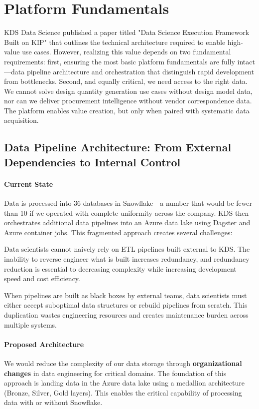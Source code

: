 \documentclass[12pt, a4paper]{article}
\begin{document}
\section{Platform Fundamentals}

KDS Data Science published a paper titled "Data Science Execution Framework Built on KIP" that outlines the technical architecture required to enable high-value use cases. However, realizing this value depends on two fundamental requirements: first, ensuring the most basic platform fundamentals are fully intact—data pipeline architecture and orchestration that distinguish rapid development from bottlenecks. Second, and equally critical, we need access to the right data. We cannot solve design quantity generation use cases without design model data, nor can we deliver procurement intelligence without vendor correspondence data. The platform enables value creation, but only when paired with systematic data acquisition.

\subsection{Data Pipeline Architecture: From External Dependencies to Internal Control}

\paragraph{Current State}
Data is processed into 36 databases in Snowflake—a number that would be fewer than 10 if we operated with complete uniformity across the company. KDS then orchestrates additional data pipelines into an Azure data lake using Dagster and Azure container jobs. This fragmented approach creates several challenges:

Data scientists cannot naively rely on ETL pipelines built external to KDS. The inability to reverse engineer what is built increases redundancy, and redundancy reduction is essential to decreasing complexity while increasing development speed and cost efficiency.

When pipelines are built as black boxes by external teams, data scientists must either accept suboptimal data structures or rebuild pipelines from scratch. This duplication wastes engineering resources and creates maintenance burden across multiple systems.

\paragraph{Proposed Architecture}
We would reduce the complexity of our data storage through \textbf{organizational changes} in data engineering for critical domains. The foundation of this approach is landing data in the Azure data lake using a medallion architecture (Bronze, Silver, Gold layers). This enables the critical capability of processing data with or without Snowflake.
\end{document}
